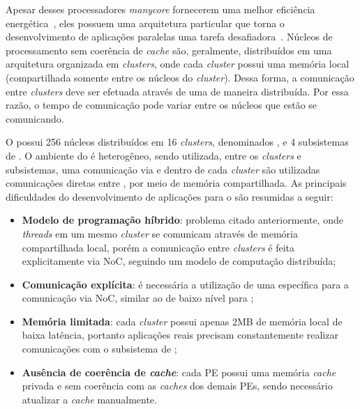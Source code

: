 Apesar desses processadores \textit{manycore} fornecerem uma melhor eficiência
energética~\cite{Castro-IA3-JPDC:2014}, eles possuem uma arquitetura particular
que torna o desenvolvimento de aplicações paralelas uma tarefa
desafiadora~\cite{Varghese14,Castro-PARCO:2016,Castro-SBAC-PAD:2014}. Núcleos de
processamento sem coerência de \textit{cache} são, geralmente, distribuídos em
uma arquitetura organizada em \textit{clusters}, onde cada \textit{cluster}
possui uma memória local (compartilhada somente entre os núcleos do
\textit{cluster}). Dessa forma, a comunicação entre \textit{clusters} deve ser efetuada através de uma \noc de maneira distribuída.
Por essa razão, o tempo de comunicação pode variar entre os núcleos que estão se
comunicando.

O \mppa possui 256 núcleos distribuídos em 16 \textit{clusters}, denominados
\pes, e 4 subsistemas de \es. O ambiente do \mppa é heterogêneo, sendo
utilizada, entre os \textit{clusters} e subsistemas, uma comunicação via \noc e
dentro de cada \textit{cluster} são utilizadas comunicações diretas entre
\pes, por meio de memória compartilhada. As principais dificuldades do
desenvolvimento de aplicações para o \mppa são resumidas a seguir:

\begin{itemize}
	\item \textbf{Modelo de programação híbrido}: problema citado anteriormente, onde \textit{threads}
em um mesmo \textit{cluster} se comunicam através de memória compartilhada
local, porém a comunicação entre \textit{clusters} é feita explicitamente via
NoC, seguindo um modelo de computação distribuída;
	\item \textbf{Comunicação explícita}: é necessária a utilização de uma \api
específica para a comunicação via NoC, similar ao \posix de baixo nível para
\ipc;
	\item \textbf{Memória limitada}: cada \textit{cluster} possui apenas 2MB de memória
local de baixa latência, portanto aplicações reais precisam constantemente
realizar comunicações com o subsistema de \es;
	\item \textbf{Ausência de coerência de \textit{cache}}: cada PE possui uma memória \textit{cache} privada e sem coerência
com as \textit{caches} dos demais PEs, sendo necessário atualizar a \textit{cache} manualmente.
\end{itemize}

